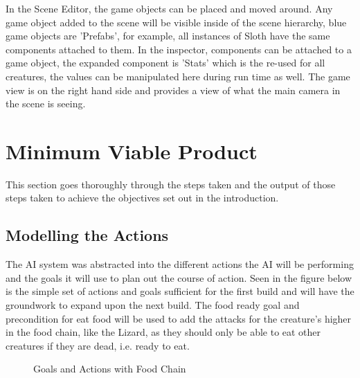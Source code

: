 \documentclass[11pt]{report}
\begin{document}
In the Scene Editor, the game objects can be placed and moved around. Any game object added to the scene will be visible inside of the scene hierarchy, blue game objects are 'Prefabs', for example, all instances of Sloth have the same components attached to them. In the inspector, components can be attached to a game object, the expanded component is 'Stats' which is the re-used for all creatures, the values can be manipulated here during run time as well. The game view is on the right hand side and provides a view of what the main camera in the scene is seeing.


\section{Minimum Viable Product}
This section goes thoroughly through the steps taken and the output of those steps taken to achieve the objectives set out in the introduction.
\subsection{Modelling the Actions}
The AI system was abstracted into the different actions the AI will be performing and the goals it will use to plan out the course of action. Seen in the figure below is the simple set of actions and goals sufficient for the first build and will have the groundwork to expand upon the next build. The food ready goal and precondition for eat food will be used to add the attacks for the creature's higher in the food chain, like the Lizard, as they should only be able to eat other creatures if they are dead, i.e. ready to eat.

\begin{figure}[H]
    \centering
    \caption{Goals and Actions with Food Chain}
\end{figure}
\end{document}
